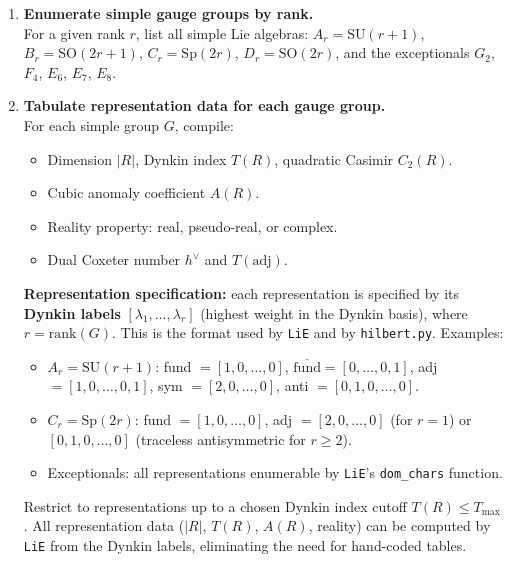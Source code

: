 \documentclass[12pt]{article}
\begin{document}
\begin{enumerate}[label=\textbf{1.\arabic*}]

\item \textbf{Enumerate simple gauge groups by rank.} \\
  For a given rank $r$, list all simple Lie algebras:
  $A_r = \mathrm{SU}(r+1)$, $B_r = \mathrm{SO}(2r+1)$, $C_r = \mathrm{Sp}(2r)$, $D_r = \mathrm{SO}(2r)$,
  and the exceptionals $G_2$, $F_4$, $E_6$, $E_7$, $E_8$.

\item \textbf{Tabulate representation data for each gauge group.} \\
  For each simple group $G$, compile:
  \begin{itemize}
    \item Dimension $|R|$, Dynkin index $T(R)$, quadratic Casimir $C_2(R)$.
    \item Cubic anomaly coefficient $A(R)$.
    \item Reality property: real, pseudo-real, or complex.
    \item Dual Coxeter number $h^\vee$ and $T(\mathrm{adj})$.
  \end{itemize}
  \textbf{Representation specification:} each representation is specified by its \textbf{Dynkin labels}
  $[\lambda_1, \ldots, \lambda_r]$ (highest weight in the Dynkin basis), where $r = \mathrm{rank}(G)$.
  This is the format used by \texttt{LiE} and by \texttt{hilbert.py}.
  Examples:
  \begin{itemize}
    \item $A_r = \mathrm{SU}(r+1)$: fund $= [1,0,\ldots,0]$, $\overline{\text{fund}} = [0,\ldots,0,1]$, adj $= [1,0,\ldots,0,1]$, sym $= [2,0,\ldots,0]$, anti $= [0,1,0,\ldots,0]$.
    \item $C_r = \mathrm{Sp}(2r)$: fund $= [1,0,\ldots,0]$, adj $= [2,0,\ldots,0]$ (for $r=1$) or $[0,1,0,\ldots,0]$ (traceless antisymmetric for $r\geq 2$).
    \item Exceptionals: all representations enumerable by \texttt{LiE}'s \texttt{dom\_chars} function.
  \end{itemize}
  Restrict to representations up to a chosen Dynkin index cutoff $T(R) \leq T_{\max}$.
  All representation data ($|R|$, $T(R)$, $A(R)$, reality) can be computed by \texttt{LiE}
  from the Dynkin labels, eliminating the need for hand-coded tables.


\end{enumerate}
\end{document}
